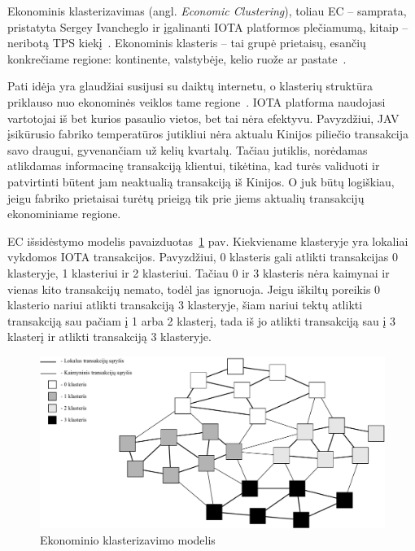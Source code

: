
 \label{subsection:dag-ec}

Ekonominis klasterizavimas (angl. \textit{Economic Clustering}), toliau EC – samprata, pristatyta Sergey Ivancheglo ir įgalinanti IOTA platformos plečiamumą, kitaip – neribotą TPS kiekį~\cite{sergey2018economic}.
Ekonominis klasteris – tai grupė prietaisų, esančių konkrečiame regione: kontinente, valstybėje, kelio ruože ar pastate~\cite{sergey2018economic}. 

Pati idėja yra glaudžiai susijusi su daiktų internetu, o klasterių struktūra priklauso nuo ekonominės veiklos tame regione~\cite{sergey2018economic}. IOTA platforma naudojasi vartotojai iš bet kurios pasaulio vietos, bet tai nėra efektyvu. Pavyzdžiui, JAV įsikūrusio fabriko temperatūros jutikliui nėra aktualu Kinijos piliečio transakcija savo draugui, gyvenančiam už kelių kvartalų. Tačiau jutiklis, norėdamas atlikdamas informacinę transakciją klientui, tikėtina, kad turės validuoti ir patvirtinti būtent jam neaktualią transakciją iš Kinijos. O juk būtų logiškiau, jeigu fabriko prietaisai turėtų prieigą tik prie jiems aktualių transakcijų ekonominiame regione.

EC išsidėstymo modelis pavaizduotas~\ref{img:10} pav. Kiekviename klasteryje yra lokaliai vykdomos IOTA transakcijos. Pavyzdžiui, 0 klasteris gali atlikti transakcijas 0 klasteryje, 1 klasteriui ir 2 klasteriui. Tačiau 0 ir 3 klasteris nėra kaimynai ir vienas kito transakcijų nemato, todėl jas ignoruoja. Jeigu iškiltų poreikis 0 klasterio nariui atlikti transakciją 3 klasteryje, šiam nariui tektų atlikti transakciją sau pačiam į 1 arba 2 klasterį, tada iš jo atlikti transakciją sau į 3 klasterį ir atlikti transakciją 3 klasteryje.

\begin{figure}[H]
    \centering
    \includegraphics[scale=0.7]{images/economic-clusters}
    \caption{Ekonominio klasterizavimo modelis}
    \label{img:10}
\end{figure}

